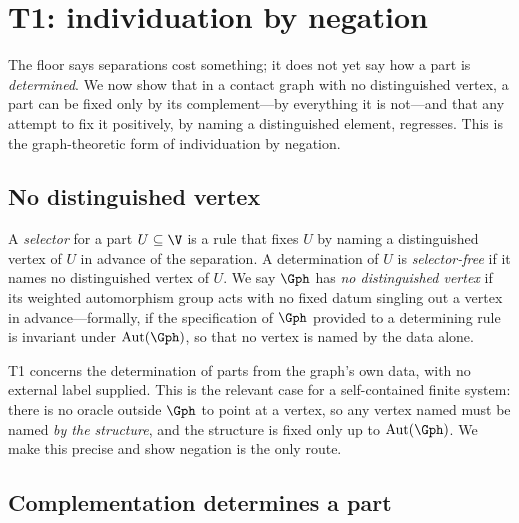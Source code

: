 
\section{T1: individuation by negation}
\label{sec:negation}

The floor says separations cost something; it does not yet say how a part is
\emph{determined}. We now show that in a contact graph with no distinguished
vertex, a part can be fixed only by its complement---by everything it is
not---and that any attempt to fix it positively, by naming a distinguished
element, regresses. This is the graph-theoretic form of individuation by
negation.

\subsection{No distinguished vertex}

\begin{definition}
\label{def:selector}
A \emph{selector} for a part $U\subseteq\V$ is a rule that fixes $U$ by naming a
distinguished vertex of $U$ in advance of the separation. A determination of $U$
is \emph{selector-free} if it names no distinguished vertex of $U$. We say
$\Gph$ has \emph{no distinguished vertex} if its weighted automorphism group
acts with no fixed datum singling out a vertex in advance---formally, if the
specification of $\Gph$ provided to a determining rule is invariant under
$\mathrm{Aut}(\Gph)$, so that no vertex is named by the data alone.
\end{definition}

\begin{remark}
\label{rem:nodist}
T1 concerns the determination of parts from the graph's own data, with no
external label supplied. This is the relevant case for a self-contained finite
system: there is no oracle outside $\Gph$ to point at a vertex, so any vertex
named must be named \emph{by the structure}, and the structure is fixed only up
to $\mathrm{Aut}(\Gph)$. We make this precise and show negation is the only
route.
\end{remark}

\subsection{Complementation determines a part}

